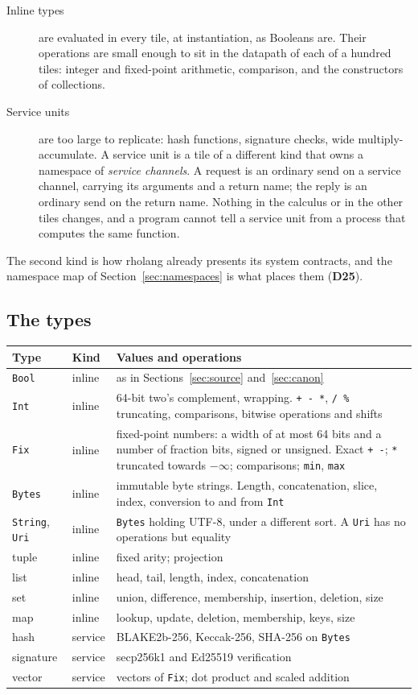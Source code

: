 \documentclass[11pt]{article}
\newcommand{\kw}[1]{\texttt{#1}}
\newcommand{\dec}[1]{\textbf{D#1}}
\theoremstyle{definition}
\theoremstyle{remark}
\begin{document}
\begin{description}
\item[Inline types] are evaluated in every tile, at instantiation, as
Booleans are. Their operations are small enough to sit in the datapath of
each of a hundred tiles: integer and fixed-point arithmetic, comparison, and
the constructors of collections.
\item[Service units] are too large to replicate: hash functions, signature
checks, wide multiply-accumulate. A service unit is a tile of a different
kind that owns a namespace of \emph{service channels}. A request is an
ordinary send on a service channel, carrying its arguments and a return
name; the reply is an ordinary send on the return name. Nothing in the
calculus or in the other tiles changes, and a program cannot tell a service
unit from a process that computes the same function.
\end{description}
The second kind is how rholang already presents its system contracts, and the
namespace map of Section~\ref{sec:namespaces} is what places them (\dec{25}).

\subsection{The types}\label{sec:types}

\noindent
\begin{tabularx}{\textwidth}{@{}l l X@{}}
\toprule
Type & Kind & Values and operations\\
\midrule
\kw{Bool} & inline & as in Sections~\ref{sec:source} and~\ref{sec:canon}\\
\kw{Int} & inline & 64-bit two's complement, wrapping. \kw{+ - *},
  \kw{/ \%} truncating, comparisons, bitwise operations and shifts\\
\kw{Fix} & inline & fixed-point numbers: a width of at most 64 bits and a
  number of fraction bits, signed or unsigned. Exact \kw{+ -}; \kw{*}
  truncated towards $-\infty$; comparisons; \kw{min}, \kw{max}\\
\kw{Bytes} & inline & immutable byte strings. Length, concatenation, slice,
  index, conversion to and from \kw{Int}\\
\kw{String}, \kw{Uri} & inline & \kw{Bytes} holding UTF-8, under a
  different sort. A \kw{Uri} has no operations but equality\\
tuple & inline & fixed arity; projection\\
list & inline & head, tail, length, index, concatenation\\
set & inline & union, difference, membership, insertion, deletion, size\\
map & inline & lookup, update, deletion, membership, keys, size\\
\midrule
hash & service & BLAKE2b-256, Keccak-256, SHA-256 on \kw{Bytes}\\
signature & service & secp256k1 and Ed25519 verification\\
vector & service & vectors of \kw{Fix}; dot product and scaled addition\\
\bottomrule
\end{tabularx}
\end{document}
